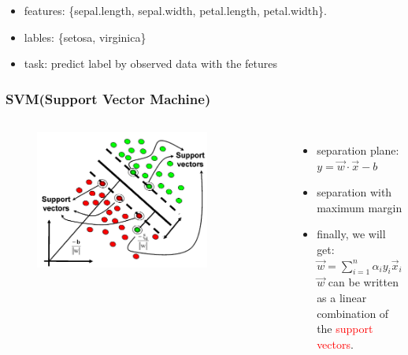\documentclass{beamer}
\begin{document}
\begin{frame}
	\begin{itemize}
		\item features: \{sepal.length, sepal.width, petal.length, petal.width\}. 
		\item lables: \{setosa, virginica\}
		\item task: predict label by observed data with the fetures
	\end{itemize}	
	
	
\end{frame}


\begin{frame}
	\frametitle{SVM(Support Vector Machine)}
	\begin{columns}[c] %
	
	\begin{figure}
		\includegraphics[width=0.8\textwidth]{fig/fig1_svm.png}
		
	\end{figure}
	
		\begin{itemize}
		\item separation plane: $y = \vec{w} \cdot \vec{x} - b$
		\item separation with maximum margin
		\item finally, we will get: \\
		$\vec w = \sum_{i=1}^n \alpha_iy_i \vec x_i$	\\
		$\vec w$ can be written as a linear combination of the \textcolor{red}{support vectors}.
		\end{itemize}			
	\end{columns}	
	

\end{frame}
\end{document}
